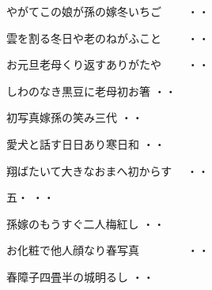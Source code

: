 \vspace{0.6cm}
\begin{shiika}やがてこの娘が孫の嫁冬いちご　　
\hfill{・・}\end{shiika}
\vspace{0.6cm}
\begin{shiika}雲を割る冬日や老のねがふこと　　
\hfill{・・}\end{shiika}
\vspace{0.6cm}
\begin{shiika}お元旦老母くり返すありがたや　　
\hfill{・・}\end{shiika}
\vspace{0.6cm}
\begin{shiika}しわのなき黒豆に老母初お箸
\hfill{・・}\end{shiika}
\vspace{0.6cm}
\begin{shiika}初写真嫁孫の笑み三代
\hfill{・・}\end{shiika}
\vspace{0.6cm}
\begin{shiika}愛犬と話す日日あり寒日和
\hfill{・・}\end{shiika}
\vspace{0.6cm}
\begin{shiika}翔ばたいて大きなおまへ初からす　
\hfill{・・}\end{shiika}
\vspace{0.6cm}
\begin{shiika}五・
\hfill{・・}\end{shiika}
\vspace{0.6cm}
\begin{shiika}孫嫁のもうすぐ二人梅紅し
\hfill{・・}\end{shiika}
\vspace{0.6cm}
\begin{shiika}お化粧で他人顔なり春写真　　　　
\hfill{・・}\end{shiika}
\vspace{0.6cm}
\begin{shiika}春障子四畳半の城明るし
\hfill{・・}\end{shiika}
